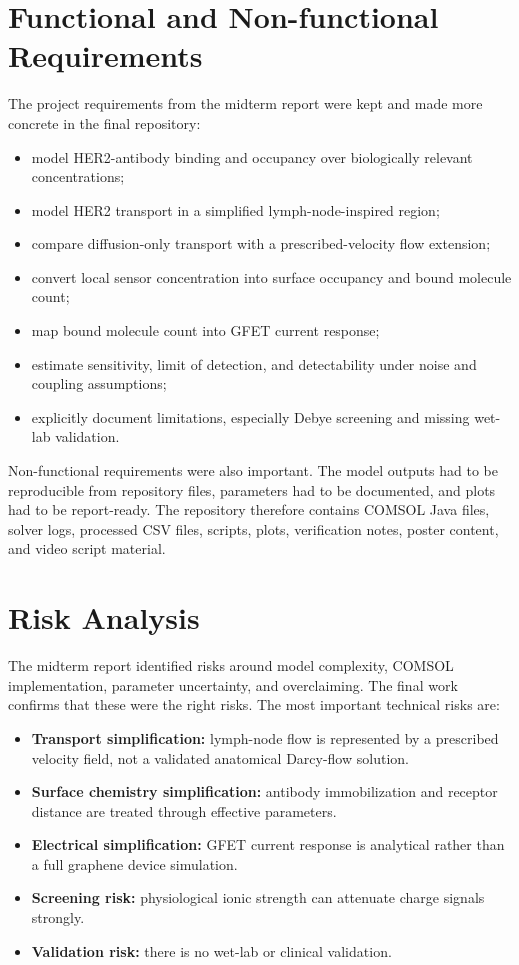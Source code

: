 \documentclass[12pt,a4paper,oneside]{report}
\begin{document}
\section{Functional and Non-functional Requirements}

The project requirements from the midterm report were kept and made more concrete in the final repository:

\begin{itemize}
    \item model HER2-antibody binding and occupancy over biologically relevant concentrations;
    \item model HER2 transport in a simplified lymph-node-inspired region;
    \item compare diffusion-only transport with a prescribed-velocity flow extension;
    \item convert local sensor concentration into surface occupancy and bound molecule count;
    \item map bound molecule count into GFET current response;
    \item estimate sensitivity, limit of detection, and detectability under noise and coupling assumptions;
    \item explicitly document limitations, especially Debye screening and missing wet-lab validation.
\end{itemize}

Non-functional requirements were also important. The model outputs had to be reproducible from repository files, parameters had to be documented, and plots had to be report-ready. The repository therefore contains COMSOL Java files, solver logs, processed CSV files, scripts, plots, verification notes, poster content, and video script material.

\section{Risk Analysis}

The midterm report identified risks around model complexity, COMSOL implementation, parameter uncertainty, and overclaiming. The final work confirms that these were the right risks. The most important technical risks are:

\begin{itemize}
    \item \textbf{Transport simplification:} lymph-node flow is represented by a prescribed velocity field, not a validated anatomical Darcy-flow solution.
    \item \textbf{Surface chemistry simplification:} antibody immobilization and receptor distance are treated through effective parameters.
    \item \textbf{Electrical simplification:} GFET current response is analytical rather than a full graphene device simulation.
    \item \textbf{Screening risk:} physiological ionic strength can attenuate charge signals strongly.
    \item \textbf{Validation risk:} there is no wet-lab or clinical validation.
\end{itemize}
\end{document}
